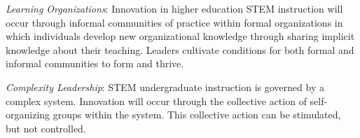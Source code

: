 \begin{gitemize}
\item
  \emph{Learning Organizations}: Innovation in higher education STEM
  instruction will occur through informal communities of practice
  within formal organizations in which individuals develop new
  organizational knowledge through sharing implicit knowledge about
  their teaching.  Leaders cultivate conditions for both formal and
  informal communities to form and thrive.

\item
  \emph{Complexity Leadership}: STEM undergraduate instruction is
  governed by a complex system. Innovation will occur through the
  collective action of self-organizing groups within the system. This
  collective action can be stimulated, but not controlled.

\end{gitemize}

